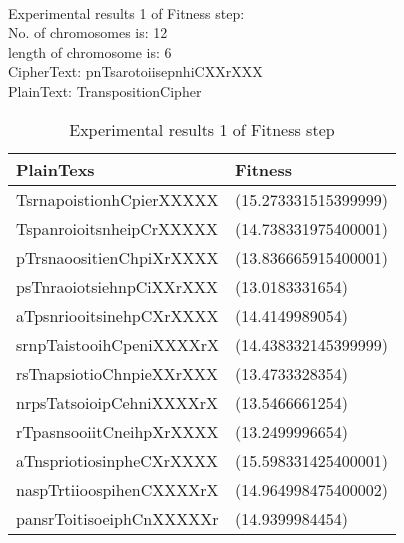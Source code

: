\\\textsf{Experimental results 1 of Fitness step:}\\
    \colorbox{blue!30}{\textsf{     No. of chromosomes is: 12}}\\
    \colorbox{blue!30}{\textsf{     length of chromosome is: 6}}\\
    \colorbox{blue!30}{\textsf{     CipherText: pnTsarotoiisepnhiCXXrXXX}}\\
    \colorbox{blue!30}{\textsf{     PlainText: TranspositionCipher}}

\begin{table}[H]
\centering
\begin{tabular}{l l}
    \hline
    \cellcolor[gray]{0.9} PlainTexs& \cellcolor[gray]{0.9} Fitness\\ \hline
    TsrnapoistionhCpierXXXXX &(15.273331515399999)\\ \hline
    TspanroioitsnheipCrXXXXX &(14.738331975400001) \\ \hline
    pTrsnaoositienChpiXrXXXX &(13.836665915400001) \\ \hline
    psTnraoiotsiehnpCiXXrXXX &(13.0183331654) \\ \hline
    aTpsnriooitsinehpCXrXXXX &(14.4149989054) \\ \hline
    srnpTaistooihCpeniXXXXrX &(14.438332145399999)\\ \hline
    rsTnapsiotioChnpieXXrXXX &(13.4733328354) \\ \hline
    nrpsTatsoioipCehniXXXXrX &(13.5466661254) \\ \hline
    rTpasnsooiitCneihpXrXXXX &(13.2499996654) \\ \hline
    aTnspriotiosinpheCXrXXXX &(15.598331425400001) \\ \hline
    naspTrtiioospihenCXXXXrX &(14.964998475400002)\\ \hline
    pansrToitisoeiphCnXXXXXr &(14.9399984454) \\ \hline
\end{tabular}
\caption{Experimental results 1 of Fitness step}

\end{table}


